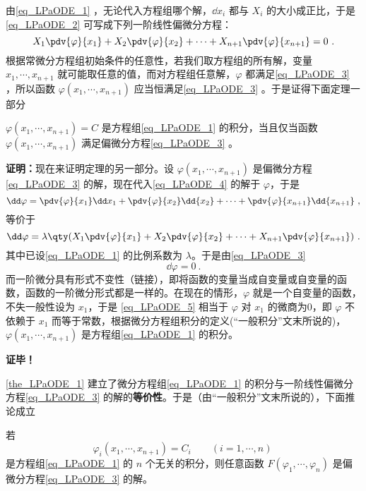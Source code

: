 由\autoref{eq_LPaODE_1} ，无论代入方程组哪个解，$\dd x_i$ 都与 $X_i$ 的大小成正比，于是\autoref{eq_LPaODE_2} 可写成下列一阶线性偏微分方程：
\begin{equation}\label{eq_LPaODE_3}
X_1\pdv{\varphi}{x_1}+X_2\pdv{\varphi}{x_2}+\cdots+X_{n+1}\pdv{\varphi}{x_{n+1}}=0~.
\end{equation}
根据常微分方程组初始条件的任意性，若我们取方程组的所有解，变量 $x_1,\cdots,x_{n+1}$ 就可能取任意的值，而对方程组任意解，$\varphi$ 都满足\autoref{eq_LPaODE_3} ，所以函数 $\varphi(x_1,\cdots,x_{n+1})$ 应当恒满足\autoref{eq_LPaODE_3} 。于是证得下面定理一部分
\begin{theorem}{}\label{the_LPaODE_1}
 $\varphi(x_1,\cdots,x_{n+1})=C$ 是方程组\autoref{eq_LPaODE_1} 的积分，当且仅当函数 $\varphi(x_1,\cdots,x_{n+1})$ 满足偏微分方程\autoref{eq_LPaODE_3} 。
\end{theorem}
 \textbf{证明：}现在来证明定理的另一部分。设 $\varphi(x_1,\cdots,x_{n+1})$ 是偏微分方程\autoref{eq_LPaODE_3} 的解，现在代入\autoref{eq_LPaODE_4} 的解于 $\varphi$，于是
 \begin{equation}
 \dd\varphi=\pdv{\varphi}{x_1}\dd x_1+\pdv{\varphi}{x_2}\dd{x_2}+\cdots+\pdv{\varphi}{x_{n+1}}\dd{x_{n+1}}~,
 \end{equation}
 等价于
 \begin{equation}
 \dd\varphi=\lambda\qty(X_1\pdv{\varphi}{x_1}+X_2\pdv{\varphi}{x_2}+\cdots+X_{n+1}\pdv{\varphi}{x_{n+1}})~.
 \end{equation}
 其中已设\autoref{eq_LPaODE_1} 的比例系数为 $\lambda$。于是由\autoref{eq_LPaODE_3} 
 \begin{equation}\label{eq_LPaODE_5}
 \dd\varphi=0~.
 \end{equation}
 而一阶微分具有形式不变性（链接），即将函数的变量当成自变量或自变量的函数，函数的一阶微分形式都是一样的。在现在的情形，$\varphi$ 就是一个自变量的函数，不失一般性设为 $x_1$，于是 \autoref{eq_LPaODE_5} 相当于 $\varphi$ 对 $x_1$ 的微商为0，即 $\varphi$ 不依赖于 $x_1$ 而等于常数，根据微分方程组积分的定义(“一般积分”文末所说的)，$\varphi(x_1,\cdots,x_{n+1})$ 是方程组\autoref{eq_LPaODE_1} 的积分。

 \textbf{证毕！}

 \autoref{the_LPaODE_1} 建立了微分方程组\autoref{eq_LPaODE_1} 的积分与一阶线性偏微分方程\autoref{eq_LPaODE_3} 的解的\textbf{等价性}。于是（由“一般积分”文末所说的），下面推论成立
 \begin{corollary}{}\label{cor_LPaODE_1}
 若
 \begin{equation}
 \varphi_i(x_1,\cdots,x_{n+1})=C_i\qquad (i=1,\cdots,n)~
 \end{equation}
 是方程组\autoref{eq_LPaODE_1} 的 $n$ 个无关的积分，则任意函数 $F(\varphi_1,\cdots,\varphi_n)$ 是偏微分方程\autoref{eq_LPaODE_3} 的解。
 \end{corollary}
